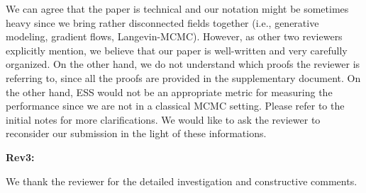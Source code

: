 \documentclass{article}
\newcommand{\rev}[1]{{\color{red} #1}}
\newcommand{\umut}[1]{{\color{blue} #1}}
\begin{document}
We can agree that the paper is technical and our notation might be sometimes heavy since we bring rather disconnected fields together (i.e., generative modeling, gradient flows, Langevin-MCMC). However, as other two reviewers explicitly mention, we believe that our paper is well-written and very carefully organized. On the other hand, we do not understand which proofs the reviewer is referring to, since all the proofs are provided in the supplementary document. On the other hand, ESS would not be an appropriate metric for measuring the performance since we are not in a classical MCMC setting. Please refer to the initial notes for more clarifications. We would like to ask the reviewer to reconsider our submission in the light of these informations.   









% 


\textbf{Rev3:}


We thank the reviewer for the detailed investigation and constructive comments. %

\end{document}
